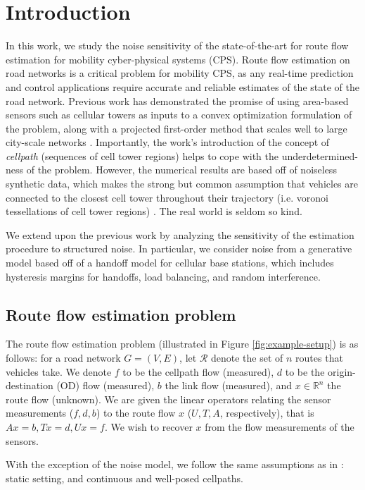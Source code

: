
\section{Introduction}
In this work, we study the noise sensitivity of the state-of-the-art for route flow estimation for mobility cyber-physical systems (CPS). Route flow estimation on road networks is a critical problem for mobility CPS, as any real-time prediction and control applications require accurate and reliable estimates of the state of the road network. Previous work has demonstrated the promise of using area-based sensors such as cellular towers as inputs to a convex optimization formulation of the problem, along with a projected first-order method that scales well to large city-scale networks \cite{Wu2015}. Importantly, the work's introduction of the concept of \textit{cellpath} (sequences of cell tower regions) helps to cope with the underdetermined-ness of the problem. However, the numerical results are based off of noiseless synthetic data, which makes the strong but common assumption that vehicles are connected to the closest cell tower throughout their trajectory (i.e. voronoi tessellations of cell tower regions) \cite{Voronoi1908}. The real world is seldom so kind.

We extend upon the previous work by analyzing the sensitivity of the estimation procedure to structured noise. In particular, we consider noise from a generative model based off of a handoff model for cellular base stations, which includes hysteresis margins for handoffs, load balancing, and random interference.
 
\subsection{Route flow estimation problem}
The route flow estimation problem (illustrated in Figure \ref{fig:example-setup}) is as follows: for a road network $G=(V,E)$, let $\mathcal{R}$ denote the set of $n$ routes that vehicles take. We denote $f$ to be the cellpath flow (measured), $d$ to be the origin-destination (OD) flow (measured), $b$ the link flow (measured), and $x \in \mathbb{R}^n$ the route flow (unknown). We are given the linear operators relating the sensor measurements ($f,d,b$) to the route flow $x$ ($U,T,A$, respectively), that is $Ax=b, Tx=d, Ux=f$. We wish to recover $x$ from the flow measurements of the sensors.

With the exception of the noise model, we follow the same assumptions as in \cite{Wu2015}: static setting, and continuous and well-posed cellpaths.

